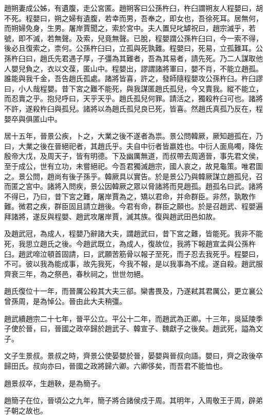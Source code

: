 趙朔妻成公姊，有遺腹，走公宮匿。趙朔客曰公孫杵臼，杵臼謂朔友人程嬰曰，胡不死。程嬰曰，朔之婦有遺腹，若幸而男，吾奉之，即女也，吾徐死耳。居無何，而朔婦免身，生男。屠岸賈聞之，索於宮中。夫人置兒叱罅祝曰，趙宗滅乎，若號，即不滅，若無聲。及索，兒竟無聲。已脫，程嬰謂公孫杵臼曰，今一索不得，後必且復索之，柰何。公孫杵臼曰，立孤與死孰難。程嬰曰，死易，立孤難耳。公孫杵臼曰，趙氏先君遇子厚，子彊為其難者，吾為其易者，請先死。乃二人謀取他人嬰兒負之，衣以文葆，匿山中。程嬰出，謬謂諸將軍曰，嬰不肖，不能立趙孤。誰能與我千金，吾告趙氏孤處。諸將皆喜，許之，發師隨程嬰攻公孫杵臼。杵臼謬曰，小人哉程嬰。昔下宮之難不能死，與我謀匿趙氏孤兒，今又賣我。縱不能立，而忍賣之乎。抱兒呼曰，天乎天乎。趙氏孤兒何罪。請活之，獨殺杵臼可也。諸將不許，遂殺杵臼與孤兒。諸將以為趙氏孤兒良已死，皆喜。然趙氏真孤乃反在，程嬰卒與俱匿山中。

居十五年，晉景公疾，卜之，大業之後不遂者為祟。景公問韓厥，厥知趙孤在，乃曰，大業之後在晉絕祀者，其趙氏乎。夫自中衍者皆嬴姓也。中衍人面鳥噣，降佐殷帝大戊，及周天子，皆有明德。下及幽厲無道，而叔帶去周適晉，事先君文侯，至于成公，世有立功，未嘗絕祀。今吾君獨滅趙宗，國人哀之，故見龜策。唯君圖之。景公問，趙尚有後子孫乎。韓厥具以實告。於是景公乃與韓厥謀立趙孤兒，召而匿之宮中。諸將入問疾，景公因韓厥之眾以脅諸將而見趙孤。趙孤名曰武。諸將不得已，乃曰，昔下宮之難，屠岸賈為之，矯以君命，并命群臣。非然，孰敢作難。微君之疾，群臣固且請立趙後。今君有命，群臣之願也。於是召趙武、程嬰遍拜諸將，遂反與程嬰、趙武攻屠岸賈，滅其族。復與趙武田邑如故。

及趙武冠，為成人，程嬰乃辭諸大夫，謂趙武曰，昔下宮之難，皆能死。我非不能死，我思立趙氏之後。今趙武既立，為成人，復故位，我將下報趙宣孟與公孫杵臼。趙武啼泣頓首固請，曰，武願苦筋骨以報子至死，而子忍去我死乎。程嬰曰，不可。彼以我為能成事，故先我死，今我不報，是以我事為不成。遂自殺。趙武服齊衰三年，為之祭邑，春秋祠之，世世勿絕。

趙氏復位十一年，而晉厲公殺其大夫三郤。欒書畏及，乃遂弒其君厲公，更立襄公曾孫周，是為悼公。晉由此大夫稍彊。

趙武續趙宗二十七年，晉平公立。平公十二年，而趙武為正卿。十三年，吳延陵季子使於晉，曰，晉國之政卒歸於趙武子、韓宣子、魏獻子之後矣。趙武死，謚為文子。

文子生景叔。景叔之時，齊景公使晏嬰於晉，晏嬰與晉叔向語。嬰曰，齊之政後卒歸田氏。叔向亦曰，晉國之政將歸六卿。六卿侈矣，而吾君不能恤也。

趙景叔卒，生趙鞅，是為簡子。

趙簡子在位，晉頃公之九年，簡子將合諸侯戍于周。其明年，入周敬王于周，辟弟子朝之故也。

